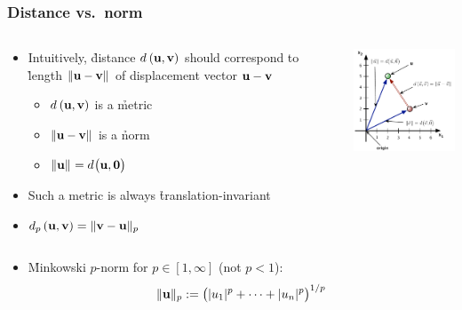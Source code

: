 \documentclass[t]{beamer} %
\begin{document}
\begin{frame}
  \frametitle{Distance vs.\ norm}

  \begin{columns}[T]
    \begin{column}{50mm}
      \begin{itemize}
      \item<1-> Intuitively, \h{distance} $\dist{\vu}{\vv}$ should correspond to
        \h{length} $\norm{\vu-\vv}$ of displacement vector $\vu - \vv$
        \begin{itemize}
        \item $\dist{\vu}{\vv}$ is a \h{metric}
        \item $\norm{\vu-\vv}$ is a \h{norm}
        \item $\norm{\vu} = \bigdist{\vu}{\vnull}$
        \end{itemize}
      \item<2-> Such a metric is always \h{translation-invariant}%
        \gap
      \item<3-> $\dist[p]{\vu}{\vv} = \norm[p]{\vv-\vu}$
      \end{itemize}
    \end{column}
    \begin{column}{50mm}
      \includegraphics[width=50mm]{img/2_distance_norm}
    \end{column}
  \end{columns}

  \begin{itemize}
  \item<3-> \h{Minkowski $p$-norm} for $p\in [1,\infty]$ (not $p < 1$):
    \[
    \norm[p]{\vu} \coloneq \bigl(\abs{u_1}^p + \dots + \abs{u_n}^p\bigr)^{1/p}
    \]
  \end{itemize}
\end{frame}
\end{document}

